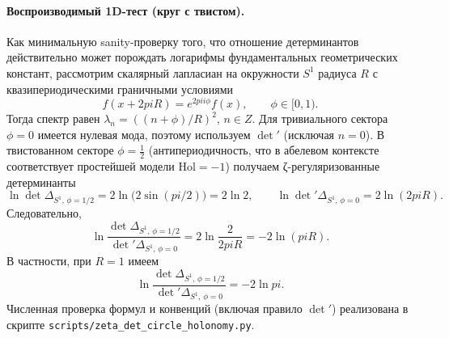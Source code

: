 \documentclass[12pt]{article}
\def\mathbb#1{#1}%
\def\pi{pi}%
\begin{document}
\paragraph{Воспроизводимый 1D-тест (круг с твистом).}
Как минимальную sanity-проверку того, что отношение детерминантов действительно может порождать логарифмы фундаментальных геометрических констант, рассмотрим скалярный лапласиан на окружности $S^1$ радиуса $R$ с квазипериодическими граничными условиями
\begin{equation}
  f(x+2\pi R)=e^{2\pi i\phi}f(x),\qquad \phi\in[0,1).
\end{equation}
Тогда спектр равен $\lambda_n=((n+\phi)/R)^2$, $n\in\mathbb{Z}$.
Для тривиального сектора $\phi=0$ имеется нулевая мода, поэтому используем $\det'$ (исключая $n=0$).
В твистованном секторе $\phi=\tfrac12$ (антипериодичность, что в абелевом контексте соответствует простейшей модели $\mathrm{Hol}=-1$) получаем ζ-регуляризованные детерминанты
\begin{equation}
  \ln\det\Delta_{S^1,\,\phi=1/2}=2\ln\bigl(2\sin(\pi/2)\bigr)=2\ln 2,
  \qquad
  \ln\det'\Delta_{S^1,\,\phi=0}=2\ln(2\pi R).
\end{equation}
Следовательно,
\begin{equation}\label{eq:S1_det_ratio_pi}
  \ln\frac{\det\Delta_{S^1,\,\phi=1/2}}{\det'\Delta_{S^1,\,\phi=0}}
  =
  2\ln\frac{2}{2\pi R}
  =
  -2\ln(\pi R).
\end{equation}
В частности, при $R=1$ имеем
\begin{equation}
  \ln\frac{\det\Delta_{S^1,\,\phi=1/2}}{\det'\Delta_{S^1,\,\phi=0}}=-2\ln\pi.
\end{equation}
Численная проверка формул и конвенций (включая правило $\det'$) реализована в скрипте \texttt{scripts/zeta\_det\_circle\_holonomy.py}.
\end{document}
